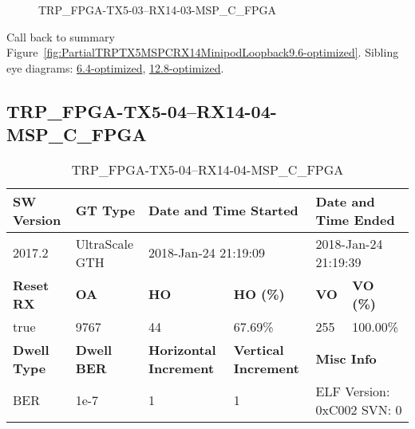 \begin{figure}[h]
\caption{TRP\_FPGA-TX5-03--RX14-03-MSP\_C\_FPGA} \label{fig:TRPFPGATX503RX1403MSPCFPGA9.6-optimized}
\end{figure}

Call back to summary Figure~\ref{fig:PartialTRPTX5MSPCRX14MinipodLoopback9.6-optimized}.
Sibling eye diagrams: \hyperref[sec:TRPFPGATX503RX1403MSPCFPGA6.4-optimized]{6.4-optimized}, \hyperref[sec:TRPFPGATX503RX1403MSPCFPGA12.8-optimized]{12.8-optimized}.

\clearpage
\newpage


\subsection{TRP\_FPGA-TX5-04--RX14-04-MSP\_C\_FPGA}\label{sec:TRPFPGATX504RX1404MSPCFPGA9.6-optimized}

\begin{table}[h]
\centering
\caption{TRP\_FPGA-TX5-04--RX14-04-MSP\_C\_FPGA}
\label{tab:TRPFPGATX504RX1404MSPCFPGA9.6-optimized}
\begin{tabular}{@{}|l|l|l|l|l|l|@{}}
\toprule
\textbf{SW Version}                & \textbf{GT Type}   & \multicolumn{2}{l|}{\textbf{Date and Time Started}}            & \multicolumn{2}{l|}{\textbf{Date and Time Ended}}        \\ \midrule
2017.2                       & UltraScale GTH          & \multicolumn{2}{l|}{2018-Jan-24 21:19:09}                   & \multicolumn{2}{l|}{2018-Jan-24 21:19:39}               \\ \midrule
\textbf{Reset RX}                  & \textbf{OA} & \textbf{HO}   & \textbf{HO (\%)} & \textbf{VO} & \textbf{VO (\%)} \\ \midrule
true & 9767        & 44          & 67.69\%        & 255        & 100.00\%       \\ \midrule
\textbf{Dwell Type}                & \textbf{Dwell BER} & \textbf{Horizontal Increment} & \textbf{Vertical Increment}    & \multicolumn{2}{l|}{\textbf{Misc Info}}                  \\ \midrule
BER                            & 1e-7        & 1        & 1           & \multicolumn{2}{l|}{ELF Version: 0xC002 SVN: 0}                         \\ \bottomrule
\end{tabular}
\end{table}

